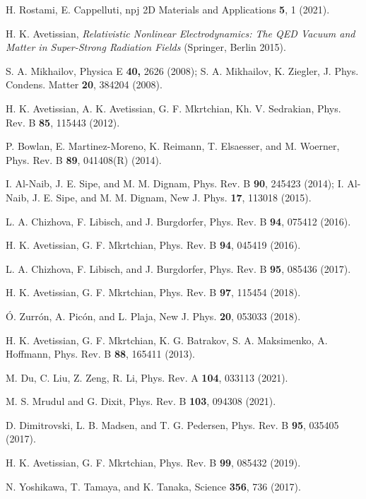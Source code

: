 \documentclass[reprint, superscriptaddress,  aps, pra]{revtex4-2}
\begin{document}
\begin{thebibliography}{99}
 H. Rostami, E. Cappelluti, npj 2D Materials and
Applications \textbf{5}, 1 (2021).

 H. K. Avetissian, \textit{Relativistic Nonlinear
Electrodynamics: The QED Vacuum and Matter in Super-Strong Radiation Fields}
(Springer, Berlin 2015).

 S. A. Mikhailov, Physica E \textbf{40, }2626 (2008);
S. A. Mikhailov, K. Ziegler, J. Phys. Condens. Matter \textbf{20}, 384204
(2008).

 H. K. Avetissian, A. K. Avetissian, G. F. Mkrtchian, Kh. V.
Sedrakian, Phys. Rev. B \textbf{85}, 115443 (2012).

 P. Bowlan, E. Martinez-Moreno, K. Reimann, T. Elsaesser, and M.
Woerner, Phys. Rev. B \textbf{89}, 041408(R) (2014).

 I. Al-Naib, J. E. Sipe, and M. M. Dignam, Phys. Rev. B 
\textbf{90}, 245423 (2014); I. Al-Naib, J. E. Sipe, and M. M. Dignam, New J.
Phys. \textbf{17}, 113018 (2015).

 L. A. Chizhova, F. Libisch, and J. Burgdorfer, Phys. Rev. B 
\textbf{94}, 075412 (2016).

 H. K. Avetissian, G. F. Mkrtchian, Phys. Rev. B \textbf{94},
045419 (2016).

 L. A. Chizhova, F. Libisch, and J. Burgdorfer, Phys. Rev. B 
\textbf{95}, 085436 (2017).

 H. K. Avetissian, G. F. Mkrtchian, Phys. Rev. B \textbf{97},
115454 (2018).

 \'{O}. Zurr\'{o}n, A. Pic\'{o}n, and L. Plaja, New J. Phys. 
\textbf{20}, 053033 (2018).

 H. K. Avetissian, G. F. Mkrtchian, K. G. Batrakov, S. A.
Maksimenko, A. Hoffmann, Phys. Rev. B \textbf{88}, 165411 (2013).

 M. Du, C. Liu, Z. Zeng, R. Li, Phys. Rev. A \textbf{104},
033113 (2021).

 M. S. Mrudul and G. Dixit, Phys. Rev. B \textbf{103}, 094308
(2021).

 D. Dimitrovski, L. B. Madsen, and T. G. Pedersen, Phys. Rev. B 
\textbf{95}, 035405 (2017).

 H. K. Avetissian, G. F. Mkrtchian, Phys. Rev. B \textbf{99},
085432 (2019).

 N. Yoshikawa, T. Tamaya, and K. Tanaka, Science \textbf{%
356}, 736 (2017).


\end{thebibliography}
\end{document}
